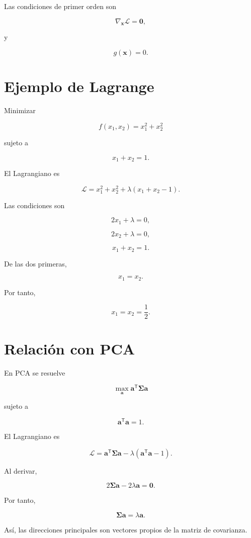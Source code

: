 \documentclass[
  spanish,
  11pt,
  letterpaper,
  DIV=11,
  numbers=noendperiod]{scrreprt}
\theoremstyle{definition}
\theoremstyle{plain}
\theoremstyle{definition}
\theoremstyle{remark}
\begin{document}
Las condiciones de primer orden son

\[
\nabla_{\mathbf{x}}
\mathcal{L}
=
\mathbf{0},
\]

y

\[
g(\mathbf{x})=0.
\]

\section{Ejemplo de Lagrange}\label{ejemplo-de-lagrange}

Minimizar

\[
f(x_1,x_2)
=
x_1^2+x_2^2
\]

sujeto a

\[
x_1+x_2=1.
\]

El Lagrangiano es

\[
\mathcal{L}
=
x_1^2+x_2^2
+
\lambda(x_1+x_2-1).
\]

Las condiciones son

\[
2x_1+\lambda=0,
\]

\[
2x_2+\lambda=0,
\]

\[
x_1+x_2=1.
\]

De las dos primeras,

\[
x_1=x_2.
\]

Por tanto,

\[
x_1=x_2=\frac{1}{2}.
\]

\section{Relación con PCA}\label{relaciuxf3n-con-pca-2}

En PCA se resuelve

\[
\max_{\mathbf{a}}
\mathbf{a}^{\mathsf T}
\boldsymbol{\Sigma}
\mathbf{a}
\]

sujeto a

\[
\mathbf{a}^{\mathsf T}\mathbf{a}=1.
\]

El Lagrangiano es

\[
\mathcal{L}
=
\mathbf{a}^{\mathsf T}
\boldsymbol{\Sigma}
\mathbf{a}
-
\lambda
(
\mathbf{a}^{\mathsf T}\mathbf{a}-1
).
\]

Al derivar,

\[
2\boldsymbol{\Sigma}\mathbf{a}
-
2\lambda\mathbf{a}
=
\mathbf{0}.
\]

Por tanto,

\[
\boldsymbol{\Sigma}\mathbf{a}
=
\lambda\mathbf{a}.
\]

Así, las direcciones principales son vectores propios de la matriz de
covarianza.
\end{document}
